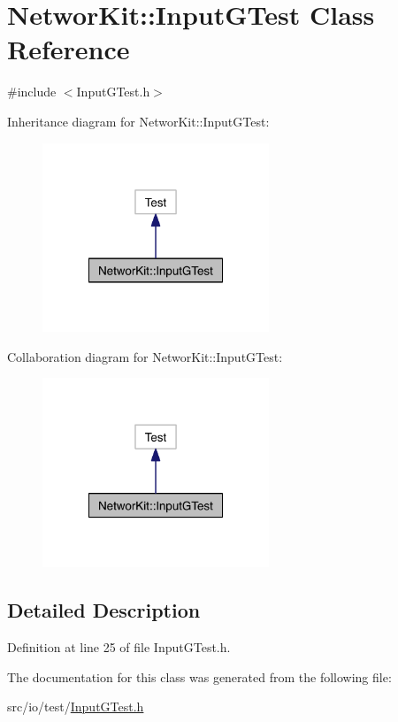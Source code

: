 \hypertarget{class_networ_kit_1_1_input_g_test}{\section{Networ\-Kit\-:\-:Input\-G\-Test Class Reference}
\label{class_networ_kit_1_1_input_g_test}
}


{\ttfamily \#include $<$Input\-G\-Test.\-h$>$}



Inheritance diagram for Networ\-Kit\-:\-:Input\-G\-Test\-:\nopagebreak
\begin{figure}[H]
\begin{center}
\leavevmode
\includegraphics[width=192pt]{class_networ_kit_1_1_input_g_test__inherit__graph}
\end{center}
\end{figure}


Collaboration diagram for Networ\-Kit\-:\-:Input\-G\-Test\-:\nopagebreak
\begin{figure}[H]
\begin{center}
\leavevmode
\includegraphics[width=192pt]{class_networ_kit_1_1_input_g_test__coll__graph}
\end{center}
\end{figure}


\subsection{Detailed Description}


Definition at line 25 of file Input\-G\-Test.\-h.



The documentation for this class was generated from the following file\-:\begin{DoxyCompactItemize}
\item 
src/io/test/\hyperlink{_input_g_test_8h}{Input\-G\-Test.\-h}\end{DoxyCompactItemize}
